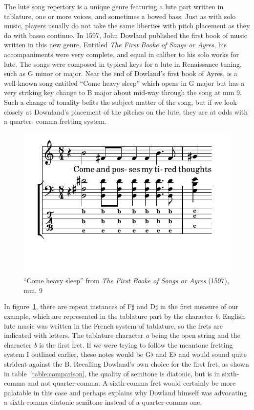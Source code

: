 The lute song repertory is a unique genre featuring a lute part written in tablature, one or more
voices, and sometimes a bowed bass.  Just as with solo music, players usually do not take the same
liberties with pitch placement as they do with basso continuo.  In 1597, John Dowland published the
first book of music written in this new genre. Entitled \textit{The First Booke of Songs or Ayres},
his accompaniments were very complete, and equal in caliber to his solo works for lute.  The songs
were composed in typical keys for a lute in Renaissance tuning, such as G minor or major. Near the
end of Dowland's first book of Ayres, is a well-known song entitled ``Come heavy sleep'' which opens
in G major but has a very striking key change to B major about mid-way through the song at mm 9.
Such a change of tonality befits the subject matter of the song, but if we look closely at
Downland's placement of the pitches on the lute, they are at odds with a quarter- comma fretting
system.
\begin{figure}[h]
\centering
\includegraphics{examples/come.pdf}
\caption{``Come heavy sleep'' from \textit{The First Booke of Songs or Ayres} (1597), mm. 9}
\label{dowland-come}
\end{figure}
In figure~\ref{dowland-come}, there are repeat instances of F$\sharp$ and D$\sharp$ in the
first measure of our example, which are represented in the tablature part by the character
\textit{b}.  English lute music was written in the French system of tablature, so the
frets are indicated with letters.  The tablature character \textit{a} being the open
string and the character \textit{b} is the first fret.  If we were trying to follow the
meantone fretting system I outlined earlier, these notes would be G$\flat$ and E$\flat$
and would sound quite strident against the B.  Recalling Dowland's own choice for the
first fret, as shown in table~\ref{table:comparison}, the quality of semitone is diatonic,
but is in sixth-comma and not quarter-comma.  A sixth-comma fret would certainly be more
palatable in this case and perhaps explains why Dowland himself was advocating a sixth-comma
diatonic semitone instead of a quarter-comma one.

